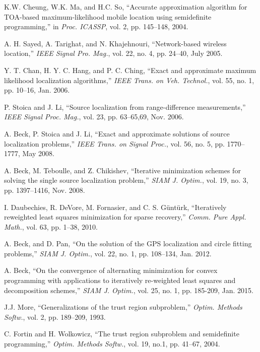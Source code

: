 \begin{thebibliography}{99}
 \label{r7}
K.W. Cheung, W.K. Ma, and H.C. So, ``Accurate approximation algorithm for TOA-based maximum-likelihood mobile location using semidefinite programming,'' in {\em Proc. ICASSP}, vol. 2, pp. 145--148, 2004.

 \label{r10}
A. H. Sayed, A. Tarighat, and N. Khajehnouri, ``Network-based wireless location,'' {\em IEEE Signal Pro. Mag.}, vol. 22, no. 4, pp. 24--40, July 2005.

 \label{r17}
Y. T. Chan, H. Y. C. Hang, and P. C. Ching, ``Exact and approximate maximum likelihood localization algorithms,'' {\em IEEE Trans. on Veh. Technol.}, vol. 55, no. 1, pp. 10--16, Jan. 2006.

 \label{r14}
P. Stoica and J. Li, ``Source localization from range-difference measurements,'' {\em IEEE Signal Proc. Mag.}, vol. 23, pp. 63--65,69, Nov. 2006.

A. Beck, P. Stoica and J. Li,  ``Exact and approximate solutions of source localization problems,'' {\em IEEE Trans. on Signal Proc.}, vol. 56, no. 5, pp. 1770--1777, May 2008.

A. Beck, M. Teboulle, and Z. Chikishev, ``Iterative minimization schemes for solving the single source localization problem,''  {\em SIAM J. Optim.}, vol. 19, no. 3, pp. 1397--1416, Nov. 2008.

I. Daubechies, R. DeVore, M. Fornasier, and C. S. G\"unt\"urk, ``Iteratively reweighted least squares minimization for sparse recovery,'' {\em Comm. Pure Appl. Math.}, vol. 63, pp. 1--38, 2010.

A. Beck, and D. Pan, ``On the solution of the GPS localization and circle fitting problems,''  {\em SIAM J. Optim.}, vol. 22, no. 1, pp. 108--134, Jan. 2012.

A. Beck, ``On the convergence of alternating minimization for convex programming with applications to iteratively re-weighted least squares and decomposition schemes,''  {\em SIAM J. Optim.}, vol. 25, no. 1, pp. 185-209, Jan. 2015.

 \label{r11}
J.J. More, ``Generalizations of the trust region subproblem,'' {\em Optim. Methods Softw.}, vol. 2, pp. 189--209, 1993.

 \label{r15}
C. Fortin and H. Wolkowicz, ``The trust region subproblem and semidefinite programming,'' {\em Optim. Methods Softw.}, vol. 19, no.1, pp. 41--67, 2004.


\end{thebibliography}
